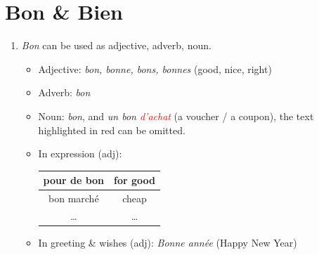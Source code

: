 \documentclass{book}
\begin{document}
    \section{Bon \& Bien}
        \begin{enumerate}
            \item \textit{Bon} can be used as adjective, adverb, noun.
                \begin{itemize}
                    \item Adjective: \textit{bon, bonne, bons, bonnes} (good, nice, right)
                    \item Adverb: \textit{bon}
                    \item Noun: \textit{bon}, and \textit{un bon \textcolor{red}{d'achat}} (a voucher / a coupon), the text highlighted in red can be omitted.
                    \item In expression (adj):
                        \begin{center}
                            \begin{tabular}{|c|c|}
                                \hline
                                pour de bon & for good \\
                                \hline
                                bon marché & cheap \\
                                \hline
                                \dots & \dots \\
                                \hline
                            \end{tabular}
                        \end{center}
                    \item In greeting \& wishes (adj): \textit{Bonne année} (Happy New Year)
                \end{itemize}
            

\end{enumerate}
\end{document}
